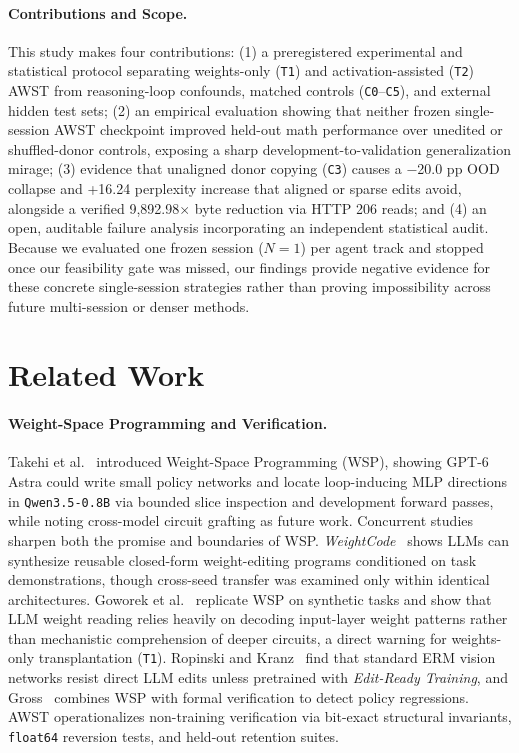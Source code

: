 \documentclass[11pt]{article}
\begin{document}
\paragraph{Contributions and Scope.}
This study makes four contributions: (1) a preregistered experimental and statistical protocol separating weights-only (\texttt{T1}) and activation-assisted (\texttt{T2}) AWST from reasoning-loop confounds, matched controls (\texttt{C0}--\texttt{C5}), and external hidden test sets; (2) an empirical evaluation showing that neither frozen single-session AWST checkpoint improved held-out math performance over unedited or shuffled-donor controls, exposing a sharp development-to-validation generalization mirage; (3) evidence that unaligned donor copying (\texttt{C3}) causes a $-$20.0 pp OOD collapse and +16.24 perplexity increase that aligned or sparse edits avoid, alongside a verified 9,892.98$\times$ byte reduction via HTTP 206 reads; and (4) an open, auditable failure analysis incorporating an independent statistical audit. Because we evaluated one frozen session ($N=1$) per agent track and stopped once our feasibility gate was missed, our findings provide negative evidence for these concrete single-session strategies rather than proving impossibility across future multi-session or denser methods.

\section{Related Work}

\paragraph{Weight-Space Programming and Verification.}
Takehi et al.~\cite{takehi2026sparks} introduced Weight-Space Programming (WSP), showing GPT-6 Astra could write small policy networks and locate loop-inducing MLP directions in \texttt{Qwen3.5-0.8B} via bounded slice inspection and development forward passes, while noting cross-model circuit grafting as future work. Concurrent studies sharpen both the promise and boundaries of WSP. \emph{WeightCode}~\cite{li2026weightcode} shows LLMs can synthesize reusable closed-form weight-editing programs conditioned on task demonstrations, though cross-seed transfer was examined only within identical architectures. Goworek et al.~\cite{goworek2026replicating} replicate WSP on synthetic tasks and show that LLM weight reading relies heavily on decoding input-layer weight patterns rather than mechanistic comprehension of deeper circuits, a direct warning for weights-only transplantation (\texttt{T1}). Ropinski and Kranz~\cite{ropinski2026editready} find that standard ERM vision networks resist direct LLM edits unless pretrained with \emph{Edit-Ready Training}, and Gross~\cite{gross2026wspverify} combines WSP with formal verification to detect policy regressions. AWST operationalizes non-training verification via bit-exact structural invariants, \texttt{float64} reversion tests, and held-out retention suites.
\end{document}
